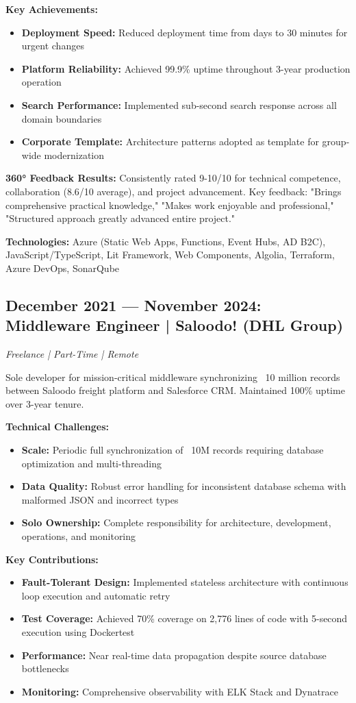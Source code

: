 \documentclass[10pt,a4paper]{article}
\begin{document}
\textbf{Key Achievements:}
\begin{itemize}
    \item \textbf{Deployment Speed:} Reduced deployment time from days to 30 minutes for urgent changes
    \item \textbf{Platform Reliability:} Achieved 99.9\% uptime throughout 3-year production operation
    \item \textbf{Search Performance:} Implemented sub-second search response across all domain boundaries
    \item \textbf{Corporate Template:} Architecture patterns adopted as template for group-wide modernization
\end{itemize}

\textbf{360° Feedback Results:} Consistently rated 9-10/10 for technical competence, collaboration (8.6/10 average), and project advancement. Key feedback: "Brings comprehensive practical knowledge," "Makes work enjoyable and professional," "Structured approach greatly advanced entire project."

\textbf{Technologies:} Azure (Static Web Apps, Functions, Event Hubs, AD B2C), JavaScript/TypeScript, Lit Framework, Web Components, Algolia, Terraform, Azure DevOps, SonarQube

\newpage

\subsection{December 2021 — November 2024: Middleware Engineer | Saloodo! (DHL Group)}
\textit{Freelance | Part-Time | Remote}

Sole developer for mission-critical middleware synchronizing ~10 million records between Saloodo freight platform and Salesforce CRM. Maintained 100\% uptime over 3-year tenure.

\textbf{Technical Challenges:}
\begin{itemize}
    \item \textbf{Scale:} Periodic full synchronization of ~10M records requiring database optimization and multi-threading
    \item \textbf{Data Quality:} Robust error handling for inconsistent database schema with malformed JSON and incorrect types
    \item \textbf{Solo Ownership:} Complete responsibility for architecture, development, operations, and monitoring
\end{itemize}

\textbf{Key Contributions:}
\begin{itemize}
    \item \textbf{Fault-Tolerant Design:} Implemented stateless architecture with continuous loop execution and automatic retry
    \item \textbf{Test Coverage:} Achieved 70\% coverage on 2,776 lines of code with 5-second execution using Dockertest
    \item \textbf{Performance:} Near real-time data propagation despite source database bottlenecks
    \item \textbf{Monitoring:} Comprehensive observability with ELK Stack and Dynatrace
\end{itemize}
\end{document}
